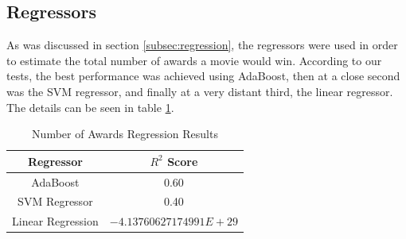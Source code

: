 \documentclass[journal,transmag]{IEEEtran}
\begin{document}
		\subsection{Regressors}
		As was discussed in section \ref{subsec:regression}, the regressors were used in order to estimate the total number of awards a movie would win. According to our tests, the best performance was achieved using AdaBoost, then at a close second was the SVM regressor, and finally at a very distant third, the linear regressor. The details can be seen in table \ref{tab:awd_r2}.
		\begin{table}
			\centering
			\begin{tabular}{|c|c|}
				\hline
				Regressor & $R^2$ Score \\
				\hline
				AdaBoost & 0.60 \\
				SVM Regressor & 0.40 \\
				Linear Regression & $-4.13760627174991E+29$ \\
				\hline
			\end{tabular}
			\caption{Number of Awards Regression Results}
			\label{tab:awd_r2}
		\end{table}	
\end{document}
